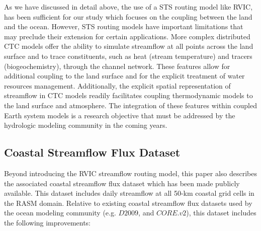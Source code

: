 \documentclass[jgrga, draft]{agutex}
\begin{document}
\begin{article}
As we have discussed in detail above, the use of a STS routing model like RVIC, has been sufficient for our study which focuses on the coupling between the land and the ocean.
However, STS routing models have important limitations that may preclude their extension for certain applications.
More complex distributed CTC models offer the ability to simulate streamflow at all points across the land surface and to trace constituents, such as heat (stream temperature) and tracers (biogeochemistry), through the channel network.
These features allow for additional coupling to the land surface and for the explicit treatment of water resources management.
Additionally, the explicit spatial representation of streamflow in CTC models readily facilitates coupling thermodynamic models to the land surface and atmosphere.
The integration of these features within coupled Earth system models is a research objective that must be addressed by the hydrologic modeling community in the coming years.

\subsection{Coastal Streamflow Flux Dataset}
Beyond introducing the RVIC streamflow routing model, this paper also describes the associated coastal streamflow flux dataset which has been made publicly available.
This dataset includes daily streamflow at all 50-km coastal grid cells in the RASM domain.
Relative to existing coastal streamflow flux datasets used by the ocean modeling community (e.g. $D2009$, and $CORE.v2$), this dataset includes the following improvements:


\end{article}
\end{document}
